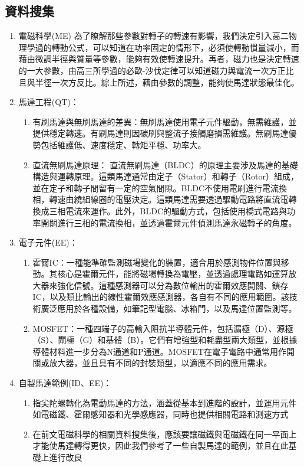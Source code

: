 \documentclass[12pt,a4paper]{article}
\begin{document}
\begin{CJK*}{UTF8}{bkai}
    \subsection{資料搜集}
    \begin{enumerate}
        \item 電磁科學(ME)
              \subitem 為了瞭解那些參數對轉子的轉速有影響，我們決定引入高二物理學過的轉動公式，可以知道在功率固定的情形下，必須使轉動慣量減小，而藉由微調半徑與質量等參數，能夠有效使轉速提升。再者，磁力也是決定轉速的一大參數，由高三所學過的必歐-沙伐定律可以知道磁力與電流一次方正比且與半徑一次方反比。綜上所述，藉由參數的調整，能夠使馬達狀態最佳化。
        \item 馬達工程(QT)：
              \begin{enumerate}
                  \item 有刷馬達與無刷馬達的差異：無刷馬達使用電子元件驅動，無需維護，並提供穩定轉速。有刷馬達則因碳刷與整流子接觸磨損需維護。無刷馬達優勢包括維護低、速度穩定、轉矩平穩、功率大。 \cite{whatBLDC}
                  \item 直流無刷馬達原理： 直流無刷馬達（BLDC）的原理主要涉及馬達的基礎構造與運轉原理。這類馬達通常由定子（Stator）和轉子（Rotor）組成，並在定子和轉子間留有一定的空氣間隙。BLDC不使用電刷進行電流換相，轉速由繞組線圈的電壓決定。這類馬達需要透過驅動電路將直流電轉換成三相電流來運作。此外，BLDC的驅動方式，包括使用橋式電路與功率開關進行三相的電流換相，並透過霍爾元件偵測馬達永磁轉子的角度。\cite{BLDCtheory1,BLDCtheory2}
              \end{enumerate}
        \item 電子元件(EE)：
              \begin{enumerate}
                  \item 霍爾IC：一種能準確監測磁場變化的裝置，適合用於感測物件位置與移動。其核心是霍爾元件，能將磁場轉換為電壓，並透過處理電路如運算放大器來強化信號。這種感測器可以分為數位輸出的霍爾效應開關、鎖存IC，以及類比輸出的線性霍爾效應感測器，各自有不同的應用範圍。該技術廣泛應用於各種設備，如筆記型電腦、冰箱門，以及馬達位置監測等。\cite{whatHall}
                  \item MOSFET：一種四端子的高輸入阻抗半導體元件，包括漏極（D）、源極（S）、閘極（G）和基體（B）。它們有增強型和耗盡型兩大類型，並根據導體材料進一步分為N通道和P通道。MOSFET在電子電路中通常用作開關或放大器，並且具有不同的封裝類型，以適應不同的應用需求。 \cite{whatMosfet}
              \end{enumerate}
        \item 自製馬達範例(ID、EE)：
              \begin{enumerate}
                  \item 指尖陀螺轉化為電動馬達的方法，涵蓋從基本到進階的設計，並運用元件如電磁鐵、霍爾感知器和光學感應器，同時也提供相關電路和測速方式 \cite{Fidget_Spinner_Motors}
                  \item 在前文電磁科學的相關資料搜集後，應該要讓磁鐵與電磁鐵在同一平面上才能使馬達轉得更快，因此我們參考了一些自製馬達的範例，並且在此基礎上進行改良 \cite{BLmoterVideo}
              \end{enumerate}
    \end{enumerate}

\end{CJK*}
\end{document}
